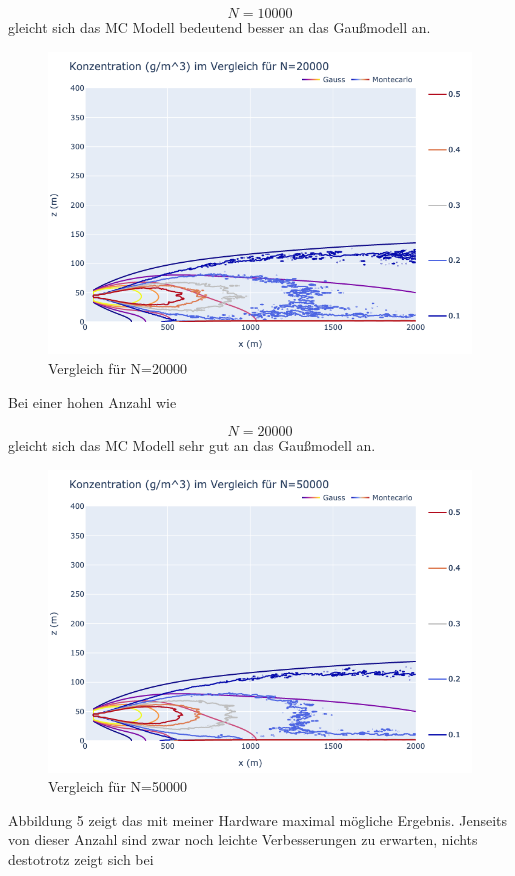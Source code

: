 \documentclass[ngerman]{scrartcl}
\begin{document}
\begin{equation}
	N=10000
\end{equation}
gleicht sich das MC Modell bedeutend besser an das Gaußmodell an.
\begin{figure}[H]
	\centering
	\includegraphics[scale=0.5]{Bilder/1b20k.png}
	\caption{Vergleich für N=20000}
	\label{fig:my_label}
\end{figure}
Bei einer hohen Anzahl wie 

\begin{equation}
	N=20000
\end{equation}
gleicht sich das MC Modell sehr gut an das Gaußmodell an.
\begin{figure}[H]
	\centering
	\includegraphics[scale=0.5]{Bilder/1b50k.png}
	\caption{Vergleich für N=50000}
	\label{fig:my_label}
\end{figure}
Abbildung 5  zeigt das mit meiner Hardware maximal mögliche Ergebnis. Jenseits von dieser Anzahl sind zwar noch leichte Verbesserungen zu erwarten, nichts destotrotz zeigt sich bei 
\end{document}
